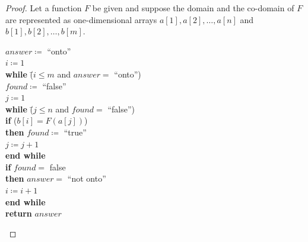 \documentclass[14pt]{extarticle}
\begin{document}
\begin{proof}
Let a function $F$ be given and suppose the domain and the co-domain of $F$ are represented as one-dimensional arrays 
\(a[1], a[2], \ldots, a[n]\) and \(b[1], b[2], \ldots, b[m]\).

\begin{tabbing}
\(answer \coloneqq\) ``onto'' \\
\(i \coloneqq 1\) \\
{\bf while} \= (\(i\leq m\) and \(answer = \) ``onto'') \\
            \> \(found \coloneqq\) ``false'' \\
            \> \(j \coloneqq 1\) \\
            \> {\bf while} \= (\(j \leq n\) and \(found =\) ``false'') \\
            \>             \> {\bf if} (\(b[i]=F(a[j])\))\\
            \>             \> {\bf then} \(found \coloneqq \) ``true'' \\
            \>             \> \(j \coloneqq j + 1\) \\
            \> {\bf end while} \\
            \> {\bf if} \(found = \) false \\
            \> {\bf then} \(answer = \) ``not onto'' \\
\(i \coloneqq i + 1\) \\
{\bf end while} \\
{\bf return} $answer$
\end{tabbing}
\end{proof}
\end{document}
